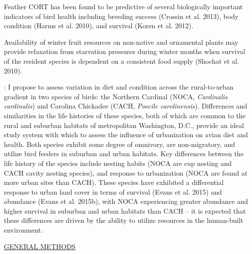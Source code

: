 \documentclass[12pt]{article}
\begin{document}
Feather CORT has been found to be predictive of several biologically important indicators of bird health including breeding success (Crossin et al. 2013), body condition (Harms et al. 2010), and survival (Koren et al. 2012).

Availability of winter fruit resources on non-native and ornamental plants may provide relaxation from starvation pressures during winter months when survival of the resident species is dependent on a consistent food supply (Shochat et al. 2010).


: I propose to assess variation in diet and condition across the rural-to-urban gradient in two species of birds: the Northern Cardinal (NOCA, \textit{Cardinalis cardinalis}) and Carolina Chickadee (CACH, \textit{Poecile carolinensis}). Differences and similarities in the life histories of these species, both of which are common to the rural and suburban habitats of metropolitan Washington, D.C., provide an ideal study system with which to assess the influence of urbanization on avian diet and health. Both species exhibit some degree of omnivory, are non-migratory, and utilize bird feeders in suburban and urban habitats. Key differences between the life history of the species include nesting habits (NOCA are cup nesting and CACH cavity nesting species), and response to urbanization (NOCA are found at more urban sites than CACH). These species have exhibited a differential response to urban land cover in terms of survival (Evans et al. 2015) and abundance (Evans et al. 2015b), with NOCA experiencing greater abundance and higher survival in suburban and urban habitats than CACH -- it is expected that these differences are driven by the ability to utilize resources in the human-built environment.


\noindent \underline{GENERAL METHODS}\par
\end{document}
